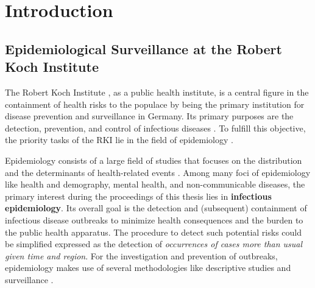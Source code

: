 \chapter{Introduction}

\section{Epidemiological Surveillance at the Robert Koch Institute}
  The Robert Koch Institute , as a public health institute, is a central figure in the containment of health risks to the populace by being the primary institution for disease prevention and surveillance in Germany.
  Its primary purposes are the detection, prevention, and control of infectious diseases \citep{rki_definition}.
  To fulfill this objective, the priority tasks of the RKI lie in the field of epidemiology \citep{rki_definition}.

  Epidemiology consists of a large field of studies that focuses on the distribution and the determinants of health-related events \citep{WHOepi}.
  Among many foci of epidemiology like health and demography, mental health, and non-communicable diseases, the primary interest during the proceedings of this thesis lies in \textbf{infectious epidemiology}.
  Its overall goal is the detection and (subsequent) containment of infectious disease outbreaks to minimize health consequences and the burden to the public health apparatus.
  The procedure to detect such potential risks could be simplified expressed as the detection of \textit{occurrences of cases more than usual given time and region}.
  For the investigation and prevention of outbreaks, epidemiology makes use of several methodologies like descriptive studies and surveillance \citep{WHOepi}.

